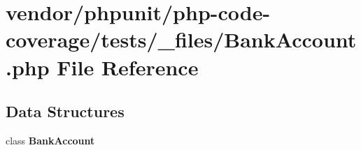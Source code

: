 \section{vendor/phpunit/php-\/code-\/coverage/tests/\+\_\+files/\+Bank\+Account.php File Reference}
\label{php-code-coverage_2tests_2__files_2_bank_account_8php}
\subsection*{Data Structures}
\begin{DoxyCompactItemize}
\item 
class {\bf Bank\+Account}
\end{DoxyCompactItemize}
